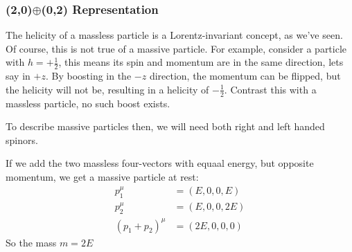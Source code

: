 \subsubsection{(2,0)$\oplus$(0,2) Representation}
The helicity of a massless particle is a Lorentz-invariant concept, as we've seen. Of course, this is not true of a massive particle. For example, consider a particle with $h=+\frac12$, this means its spin and momentum are in the same direction, lets say in $+z$. By boosting in the $-z$ direction, the momentum can be flipped, but the helicity will not be, resulting in a helicity of $-\frac12$. Contrast this with a massless particle, no such boost exists.

To describe massive particles then, we will need both right and left handed spinors.

If we add the two massless four-vectors with equaal energy, but opposite momentum, we get a massive particle at rest:
\begin{align*}
  p_1^\mu&=(E,0,0,E)\\
  p_2^\mu&=(E,0,0,2E)\\
  (p_1+p_2)^\mu&=(2E,0,0,0)
\end{align*}
So the mass $m=2E$

